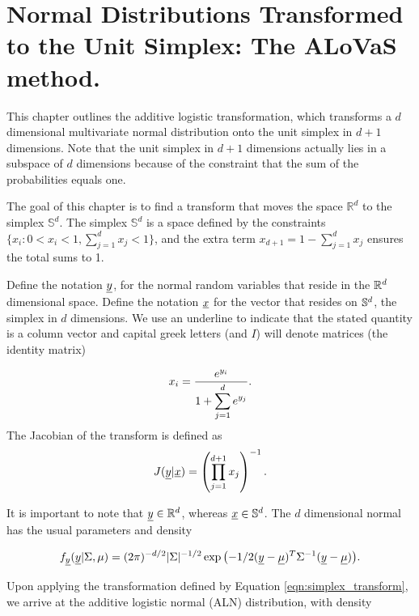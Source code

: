 
\section{Normal Distributions Transformed to the Unit Simplex: The ALoVaS method. }\label{sec:ALN_chapter}

This chapter outlines the additive logistic transformation, which transforms a $d$ dimensional multivariate normal distribution onto the unit simplex in $d+1$ dimensions. Note that the unit simplex in $d+1$ dimensions actually lies in a subspace of $d$ dimensions because of the constraint that the sum of the probabilities equals one. 

The goal of this chapter is to find a transform that moves the space $\mathbb{R}^d$  to the simplex $\mathbb{S}^d$.  The simplex $\mathbb{S}^d$ is a space defined by the constraints $\{x_i: 0<x_i<1, \sum_{j=1}^dx_j <1 \}$, and the extra term $x_{d+1}=1-\sum_{j=1}^d x_j$ ensures the total sums to 1.  

Define the notation $\underline{y}$, for the normal random variables that reside in the $\mathbb{R}^{d}$  dimensional space. Define the notation $\underline{x}$  for the vector that resides on $\mathbb{S}^{d}$, the simplex in $d$ dimensions. We use an underline to indicate that the stated quantity is a column vector and capital greek letters (and $I$) will denote matrices (the identity matrix) 

\begin{equation}\label{eqn:simplex_transform}
x_i = \frac{e^{y_i}}{1+\displaystyle{\sum_{j=1}^de^{y_j}}}. \\
\end{equation}
The Jacobian of the transform is defined as
\begin{equation}\label{eqn:jacobian}
J(\underline{y} \vert \underline{x}) = \left( \prod_{j=1}^{d+1}x_j \right)^{-1}.
\end{equation}

It is important to note that $\underline{y}\in\mathbb{R}^{d}$, whereas $\underline{x}\in\mathbb{S}^{d}$. The $d$ dimensional normal has the usual parameters and density

\begin{equation}\label{eqn:multinormal}
f_{\underline{y}}(\underline{y}\vert \Sigma, \mu)=(2\pi)^{-d/2}|\Sigma|^{-1/2}\exp{\left(-1/2(\underline{y}-\underline{\mu})^T\Sigma^{-1}(\underline{y}-\underline{\mu})\right)}.
\end{equation}

Upon applying the transformation defined by Equation \ref{eqn:simplex_transform}, we arrive at the additive logistic normal (ALN) distribution, with density 

